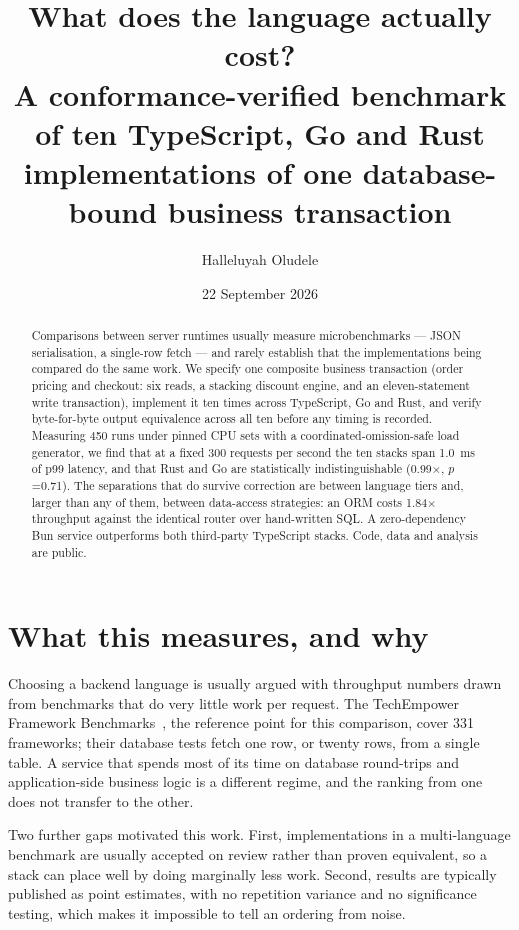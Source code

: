 \documentclass[11pt,a4paper]{article}
\title{\textbf{What does the language actually cost?}\\[.3em]
\large A conformance-verified benchmark of ten TypeScript, Go and Rust
implementations of one database-bound business transaction}
\author{Halleluyah Oludele}
\date{22 September 2026}
\begin{document}
\maketitle

\begin{abstract}
\noindent
Comparisons between server runtimes usually measure microbenchmarks --- JSON
serialisation, a single-row fetch --- and rarely establish that the
implementations being compared do the same work. We specify one composite
business transaction (order pricing and checkout: six reads, a stacking
discount engine, and an eleven-statement write transaction), implement it ten
times across TypeScript, Go and Rust, and verify byte-for-byte output
equivalence across all ten before any timing is recorded. Measuring 450 runs
under pinned CPU sets with a coordinated-omission-safe load generator, we find
that at a fixed 300 requests per second the ten stacks span
1.0~ms of p99 latency, and that Rust and Go are statistically
indistinguishable (0.99$\times$, $p$=0.71). The separations that do survive
correction are between language tiers and, larger than any of them, between
data-access strategies: an ORM costs 1.84$\times$ throughput against the
identical router over hand-written SQL. A zero-dependency Bun service
outperforms both third-party TypeScript stacks. Code, data and analysis are
public.
\end{abstract}

\section{What this measures, and why}

Choosing a backend language is usually argued with throughput numbers drawn
from benchmarks that do very little work per request. The TechEmpower Framework
Benchmarks~\cite{techempower}, the reference point for this comparison, cover
331 frameworks; their database tests fetch one row, or twenty rows, from a
single table. A service that spends most of its time on database round-trips
and application-side business logic is a different regime, and the ranking from
one does not transfer to the other.

Two further gaps motivated this work. First, implementations in a
multi-language benchmark are usually accepted on review rather than proven
equivalent, so a stack can place well by doing marginally less work. Second,
results are typically published as point estimates, with no repetition variance
and no significance testing, which makes it impossible to tell an ordering from
noise.
\end{document}
